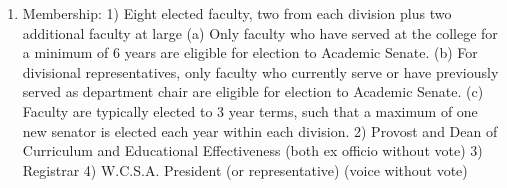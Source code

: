 \documentclass[letterpaper, 11pt]{article}
\begin{document}
				\begin{enumerate}[label=\alph*)]
					\item{Membership:}
					1) Eight elected faculty, two from each division plus two additional faculty at large
					(a) Only faculty who have served at the college for a minimum of 6 years are eligible for election to Academic Senate.
					(b) For divisional representatives, only faculty who currently serve or have previously served as department chair are eligible for election to Academic Senate.
					(c) Faculty are typically elected to 3 year terms, such that a maximum of one new senator is elected each year within each division.
					2) Provost and Dean of Curriculum and Educational Effectiveness (both ex officio without vote)
					3) Registrar
					4) W.C.S.A. President (or representative) (voice without vote)


\end{enumerate}
\end{document}
